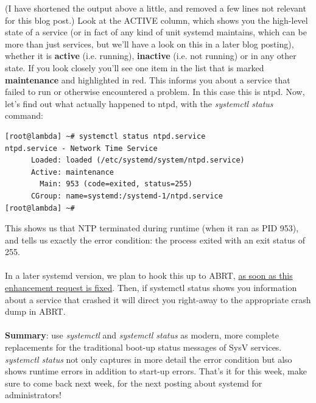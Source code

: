 \documentclass[titlepage]{article}
\begin{document}
(I have shortened the output above a little, and removed a few lines not relevant for this blog post.)
Look at the ACTIVE column, which shows you the high-level state of a service (or in fact of any kind of unit systemd maintains, which can be more than just services, but we'll have a look on this in a later blog posting), whether it is \textbf{active} (i.e. running), \textbf{inactive} (i.e. not running) or in any other state. If you look closely you'll see one item in the list that is marked \textbf{maintenance} and highlighted in red. This informs you about a service that failed to run or otherwise encountered a problem. In this case this is ntpd. Now, let's find out what actually happened to ntpd, with the \textit{systemctl status} command:
\begin{lstlisting}
[root@lambda] ~# systemctl status ntpd.service
ntpd.service - Network Time Service
      Loaded: loaded (/etc/systemd/system/ntpd.service)
      Active: maintenance
        Main: 953 (code=exited, status=255)
      CGroup: name=systemd:/systemd-1/ntpd.service
[root@lambda] ~#
\end{lstlisting}
This shows us that NTP terminated during runtime (when it ran as PID 953), and tells us exactly the error condition: the process exited with an exit status of 255.
\\
\\
In a later systemd version, we plan to hook this up to ABRT, \href{https://bugzilla.redhat.com/show_bug.cgi?id=622773}{as soon as this enhancement request is fixed}. Then, if systemctl status shows you information about a service that crashed it will direct you right-away to the appropriate crash dump in ABRT.
\\
\\
\textbf{Summary}: use \textit{systemctl} and \textit{systemctl status} as modern, more complete replacements for the traditional boot-up status messages of SysV services. \textit{systemctl status} not only captures in more detail the error condition but also shows runtime errors in addition to start-up errors.
That's it for this week, make sure to come back next week, for the next posting about systemd for administrators!
\end{document}
